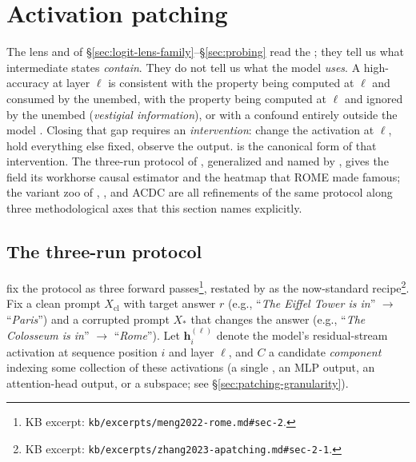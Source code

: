 
\section{Activation patching}
\label{sec:patching}

The lens and  of \S\ref{sec:logit-lens-family}--\S\ref{sec:probing}
read the ; they tell us what intermediate states
\emph{contain}. They do not tell us what the model \emph{uses}. A
high-accuracy  at layer $\ell$ is consistent with the property
being computed at $\ell$ and consumed by the unembed, with the property
being computed at $\ell$ and ignored by the unembed (\emph{vestigial
information}), or with a confound entirely outside the model
\citep{belinkov2022-probing-survey}. Closing that gap requires an
\emph{intervention}: change the activation at $\ell$, hold everything
else fixed, observe the output.  is the canonical
form of that intervention. The three-run protocol of
\citet{meng2022-rome}, generalized and named by
\citet{zhang2023-apatching}, gives the field its workhorse causal
estimator and the heatmap that ROME made famous; the variant zoo of
 \citep{wang2022-ioi}, , and ACDC
\citep{conmy2023-acdc} are all refinements of the same protocol along
three methodological axes that this section names explicitly.

\subsection{The three-run protocol}
\label{sec:patching-protocol}

\citet{meng2022-rome} fix the protocol as three forward
passes\footnote{KB excerpt:
\nolinkurl{kb/excerpts/meng2022-rome.md#sec-2}.}, restated by
\citet[\S 2.1]{zhang2023-apatching} as the now-standard
recipe\footnote{KB excerpt:
\nolinkurl{kb/excerpts/zhang2023-apatching.md#sec-2-1}.}. Fix a clean
prompt $X_{\text{cl}}$ with target answer $r$ (e.g.,
``\textit{The Eiffel Tower is in}'' $\to$ ``\textit{Paris}'') and a
corrupted prompt $X_{*}$ that changes the answer (e.g.,
``\textit{The Colosseum is in}'' $\to$ ``\textit{Rome}''). Let
$\mathbf{h}_i^{(\ell)}$ denote the model's residual-stream activation
at sequence position $i$ and layer $\ell$, and $C$ a candidate
\emph{component} indexing some collection of these activations
(a single , an MLP output, an attention-head output,
or a subspace; see \S\ref{sec:patching-granularity}).

